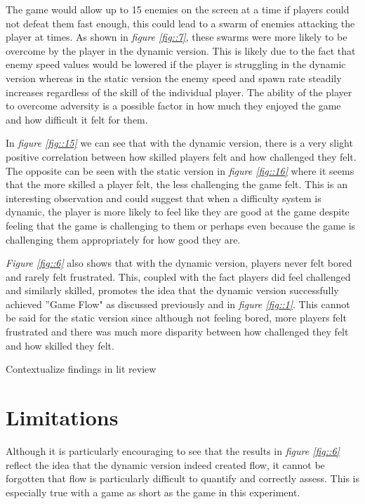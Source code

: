 \documentclass[journal]{IEEEtran}
\begin{document}
The game would allow up to 15 enemies on the screen at a time if players could not defeat them fast enough, this could lead to a swarm of enemies attacking the player at times. As shown in \textit{figure \ref{fig::7}}, these swarms were more likely to be overcome by the player in the dynamic version. This is likely due to the fact that enemy speed values would be lowered if the player is struggling in the dynamic version whereas in the static version the enemy speed and spawn rate steadily increases regardless of the skill of the individual player. The ability of the player to overcome adversity is a possible factor in how much they enjoyed the game and how difficult it felt for them.

In \textit{figure \ref{fig::15}} we can see that with the dynamic version, there is a very slight positive correlation between how skilled players felt and how challenged they felt. The opposite can be seen with the static version in \textit{figure \ref{fig::16}} where it seems that the more skilled a player felt, the less challenging the game felt. This is an interesting observation and could suggest that when a difficulty system is dynamic, the player is more likely to feel like they are good at the game despite feeling that the game is challenging to them or perhaps even because the game is challenging them appropriately for how good they are.

\textit{Figure \ref{fig::6}} also shows that with the dynamic version, players never felt bored and rarely felt frustrated. This, coupled with the fact players did feel challenged and similarly skilled, promotes the idea that the dynamic version successfully achieved ''Game Flow" as discussed previously and in \textit{figure \ref{fig::1}}. This cannot be said for the static version since although not feeling bored, more players felt frustrated and there was much more disparity between how challenged they felt and how skilled they felt. 

Contextualize findings in lit review


\section{Limitations}

Although it is particularly encouraging to see that the results in \textit{figure \ref{fig::6}} reflect the idea that the dynamic version indeed created flow, it cannot be forgotten that flow is particularly difficult to quantify and correctly assess. This is especially true with a game as short as the game in this experiment.
\end{document}
